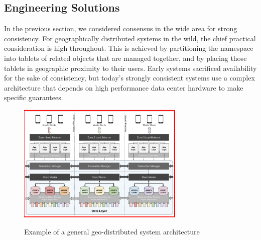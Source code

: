 \documentclass[sigplan,screen,review,anonymous,nonacm]{acmart}
\begin{document}
\subsection{Engineering Solutions}
In the previous section, we considered consensus in the wide area for strong 
consistency. 
For geographically distributed systems in the wild, the chief practical consideration 
is high throughout. 
This is achieved by partitioning the namespace into tablets of related objects that are 
managed together, and by placing those tablets in geographic proximity to their users. 
Early systems sacrificed availability for the sake of consistency, but today's strongly 
consistent systems use a complex architecture that depends on high performance data 
center hardware to make specific guarantees.

\begin{figure}
\caption{Example of a general geo-distributed system architecture}
\centering
\includegraphics[width=8cm]{figure_1_general_architecture.png}
\label{fig:general_architecture}
\end{figure}
\end{document}
